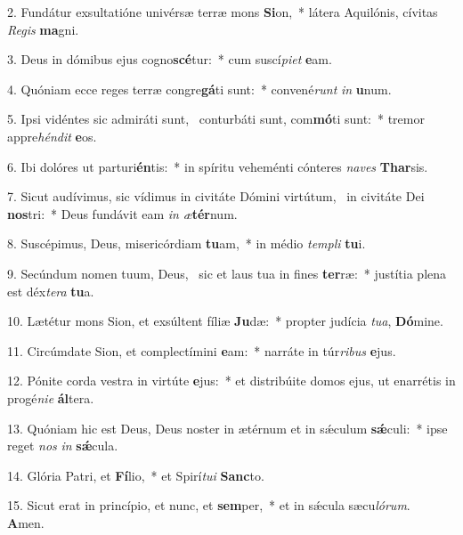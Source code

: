 2. Fundátur exsultatióne univérsæ terræ mons \textbf{Si}on,~*  látera Aquilónis, cívitas \textit{Re}\textit{gis} \textbf{ma}gni.\

3. Deus in dómibus ejus cogno\textbf{scé}tur:~*  cum suscí\textit{pi}\textit{et} \textbf{e}am.\

4. Quóniam ecce reges terræ congre\textbf{gá}ti sunt:~*  convené\textit{runt} \textit{in} \textbf{u}num.\

5. Ipsi vidéntes sic admiráti sunt, \dag\  conturbáti sunt, com\textbf{mó}ti sunt:~*  tremor appre\textit{hén}\textit{dit} \textbf{e}os.\

6. Ibi dolóres ut parturi\textbf{én}tis:~*  in spíritu veheménti cónteres \textit{na}\textit{ves} \textbf{Thar}sis.\

7. Sicut audívimus, sic vídimus in civitáte Dómini virtútum, \dag\  in civitáte Dei \textbf{nos}tri:~*  Deus fundávit eam \textit{in} \textit{æ}\textbf{tér}num.\

8. Suscépimus, Deus, misericórdiam \textbf{tu}am,~*  in médio \textit{tem}\textit{pli} \textbf{tu}i.\

9. Secúndum nomen tuum, Deus, \dag\  sic et laus tua in fines \textbf{ter}ræ:~*  justítia plena est déx\textit{te}\textit{ra} \textbf{tu}a.\

10. Lætétur mons Sion, et exsúltent fíliæ \textbf{Ju}dæ:~*  propter judícia \textit{tu}\textit{a}, \textbf{Dó}mine.\

11. Circúmdate Sion, et complectímini \textbf{e}am:~*  narráte in túr\textit{ri}\textit{bus} \textbf{e}jus.\

12. Pónite corda vestra in virtúte \textbf{e}jus:~*  et distribúite domos ejus, ut enarrétis in progé\textit{ni}\textit{e} \textbf{ál}tera.\

13. Quóniam hic est Deus, Deus noster in ætérnum et in sǽculum \textbf{sǽ}culi:~*  ipse reget \textit{nos} \textit{in} \textbf{sǽ}cula.\

14. Glória Patri, et \textbf{Fí}lio,~*  et Spirí\textit{tu}\textit{i} \textbf{Sanc}to.\

15. Sicut erat in princípio, et nunc, et \textbf{sem}per,~*  et in sǽcula sæcu\textit{ló}\textit{rum}. \textbf{A}men.\

